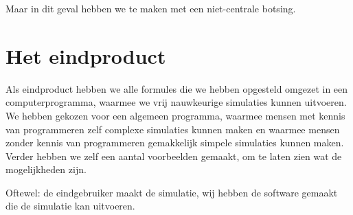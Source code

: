 \documentclass[12pt,a4paper]{article}
\begin{document}
	Maar in dit geval hebben we te maken met een niet-centrale botsing.

	\newpage

	\section{Het eindproduct}
	Als eindproduct hebben we alle formules die we hebben opgesteld omgezet in een computerprogramma, waarmee we vrij nauwkeurige simulaties kunnen uitvoeren. We hebben gekozen voor een algemeen programma, waarmee mensen met kennis van programmeren zelf complexe simulaties kunnen maken en waarmee mensen zonder kennis van programmeren gemakkelijk simpele simulaties kunnen maken. Verder hebben we zelf een aantal voorbeelden gemaakt, om te laten zien wat de mogelijkheden zijn.
	
	Oftewel: de eindgebruiker maakt de simulatie, wij hebben de software gemaakt die de simulatie kan uitvoeren.
	
\end{document}
